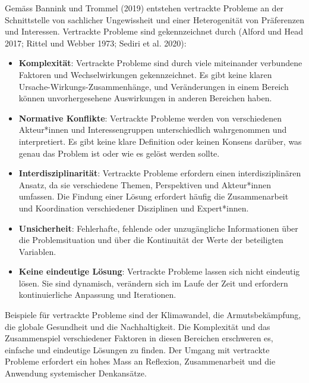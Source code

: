 \documentclass[
  nswissgerman,
  a4paper,
  DIV=11,
  numbers=noendperiod,
  oneside,
  openany]{scrreprt}
\begin{document}
\begin{tcolorbox}[enhanced jigsaw, arc=.35mm, bottomrule=.15mm, bottomtitle=1mm, breakable, colback=white, colbacktitle=quarto-callout-note-color!10!white, colframe=quarto-callout-note-color-frame, coltitle=black, left=2mm, leftrule=.75mm, opacityback=0, opacitybacktitle=0.6, rightrule=.15mm, title={Vertrackte Probleme}, titlerule=0mm, toprule=.15mm, toptitle=1mm]

Gemäss Bannink und Trommel (2019) entstehen vertrackte Probleme an der
Schnittstelle von sachlicher Ungewissheit und einer Heterogenität von
Präferenzen und Interessen. Vertrackte Probleme sind gekennzeichnet
durch (Alford und Head 2017; Rittel und Webber 1973; Sediri et al.
2020):

\begin{itemize}
\item
  \textbf{Komplexität}: Vertrackte Probleme sind durch viele miteinander
  verbundene Faktoren und Wechselwirkungen gekennzeichnet. Es gibt keine
  klaren Ursache-Wirkungs-Zusammenhänge, und Veränderungen in einem
  Bereich können unvorhergesehene Auswirkungen in anderen Bereichen
  haben.
\item
  \textbf{Normative Konflikte}: Vertrackte Probleme werden von
  verschiedenen Akteur*innen und Interessengruppen unterschiedlich
  wahrgenommen und interpretiert. Es gibt keine klare Definition oder
  keinen Konsens darüber, was genau das Problem ist oder wie es gelöst
  werden sollte.
\item
  \textbf{Interdisziplinarität}: Vertrackte Probleme erfordern einen
  interdisziplinären Ansatz, da sie verschiedene Themen, Perspektiven
  und Akteur*innen umfassen. Die Findung einer Lösung erfordert häufig
  die Zusammenarbeit und Koordination verschiedener Disziplinen und
  Expert*innen.
\item
  \textbf{Unsicherheit}: Fehlerhafte, fehlende oder unzugängliche
  Informationen über die Problemsituation und über die Kontinuität der
  Werte der beteiligten Variablen.
\item
  \textbf{Keine eindeutige Lösung}: Vertrackte Probleme lassen sich
  nicht eindeutig lösen. Sie sind dynamisch, verändern sich im Laufe der
  Zeit und erfordern kontinuierliche Anpassung und Iterationen.
\end{itemize}

Beispiele für vertrackte Probleme sind der Klimawandel, die
Armutsbekämpfung, die globale Gesundheit und die Nachhaltigkeit. Die
Komplexität und das Zusammenspiel verschiedener Faktoren in diesen
Bereichen erschweren es, einfache und eindeutige Lösungen zu finden. Der
Umgang mit vertrackte Probleme erfordert ein hohes Mass an Reflexion,
Zusammenarbeit und die Anwendung systemischer Denkansätze.

\end{tcolorbox}
\end{document}
